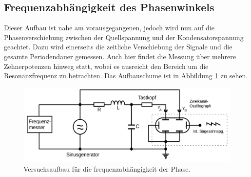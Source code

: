 \subsection{Frequenzabhängigkeit des Phasenwinkels}
Dieser Aufbau ist nahe am vorausgegangenen, jedoch wird nun auf die Phasenverschiebung zwischen der Quellspannung und der Kondensatorspannung geachtet.
Dazu wird einerseits die zeitliche Verschiebung der Signale und die gesamte Periodendauer gemessen.
Auch hier findet die Messung über mehrere Zehnerpotenzen hinweg statt, 
wobei es ausreicht den Bereich um die Resonanzfrequenz zu betrachten.
Das Aufbauschume ist in Abbildung \ref{fig:aufbau4} zu sehen.
\begin{figure}[H]
    \centering
    \caption{Versuchsaufbau für die frequenzabhängigkeit der Phase.\cite{v354}}
    \label{fig:aufbau4}
    \includegraphics[width=\textwidth]{content/aufbau4.png}
\end{figure}
\noindent
%

